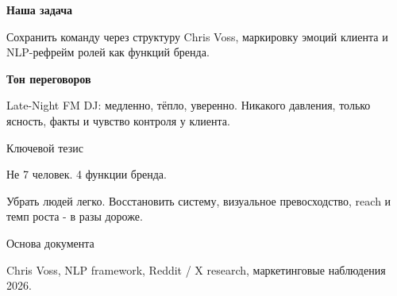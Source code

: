 \documentclass[11pt,a4paper]{article}
\begin{document}
\begin{titlepage}
\begin{minipage}[t]{0.62\linewidth}
\vspace{4mm}

\begin{tcolorbox}[colback=white, colframe=white, opacityback=0.08, opacityframe=0.12, arc=6mm, left=4mm, right=4mm, top=3mm, bottom=3mm]
{\sansfont\bfseries\color{white!92} Наша задача}\par
{\color{white!76}\fontsize{10.8}{14}\selectfont Сохранить команду через структуру Chris Voss, маркировку эмоций клиента и NLP-рефрейм ролей как функций бренда.}
\end{tcolorbox}

\vspace{4mm}

\begin{tcolorbox}[colback=white, colframe=white, opacityback=0.08, opacityframe=0.12, arc=6mm, left=4mm, right=4mm, top=3mm, bottom=3mm]
{\sansfont\bfseries\color{white!92} Тон переговоров}\par
{\color{white!76}\fontsize{10.8}{14}\selectfont Late-Night FM DJ: медленно, тёпло, уверенно. Никакого давления, только ясность, факты и чувство контроля у клиента.}
\end{tcolorbox}
\end{minipage}
\hfill
\begin{minipage}[t]{0.32\linewidth}
\vspace{18mm}
\begin{tcolorbox}[colback=white, colframe=white, opacityback=0.09, opacityframe=0.14, arc=9mm, left=6mm, right=6mm, top=8mm, bottom=8mm, height=0.56\textheight]
{\color{white}\fontsize{36}{36}\par}
\vspace{18mm}
{\color{white!70}\sansfont\fontsize{8.5}{10}\selectfont Ключевой тезис\par}
\vspace{3mm}
{\headingfont\color{white}\fontsize{18}{20}\selectfont Не 7 человек. 4 функции бренда.\par}
\vspace{7mm}
{\color{white!80}\fontsize{11.2}{15}\selectfont
Убрать людей легко. Восстановить систему, визуальное превосходство, reach и темп роста - в разы дороже.\par}
\vfill
{\color{white!68}\sansfont\fontsize{8.5}{11}\selectfont Основа документа\par}
{\color{white!78}\fontsize{10.2}{14}\selectfont Chris Voss, NLP framework, Reddit / X research, маркетинговые наблюдения 2026.}
\end{tcolorbox}
\end{minipage}
\end{titlepage}
\end{document}

